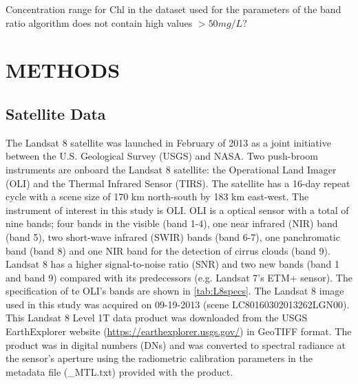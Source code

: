 \documentclass[draft]{spie}  %
\begin{document}
Concentration range for Chl in the dataset used for the parameters of the band ratio algorithm does not contain high values $> 50mg/L?$

\section{METHODS}
\label{sec:methods}
\subsection{Satellite Data}
The Landsat 8 satellite was launched in February of 2013 as a joint initiative between the U.S. Geological Survey (USGS) and NASA. Two push-broom instruments are onboard the Landsat 8 satellite: the Operational Land Imager (OLI) and the Thermal Infrared Sensor (TIRS). The satellite has a 16-day repeat cycle with a scene size of 170 km north-south by 183 km east-west. The instrument of interest in this study is OLI. OLI is a optical sensor with a total of nine bands; four bands in the visible (band 1-4), one near infrared (NIR) band (band 5), two short-wave infrared (SWIR) bands (band 6-7), one panchromatic band (band 8) and one NIR band for the detection of cirrus clouds (band 9). Landsat 8 has a higher signal-to-noise ratio (SNR) and two new bands (band 1 and band 9) compared with its predecessors (e.g. Landsat 7’s ETM+ sensor). The specification of te OLI's bands are shown in \autoref{tab:L8specs}. The Landsat 8 image used in this study was acquired on 09-19-2013 (scene LC80160302013262LGN00). This Landsat 8 Level 1T data product was downloaded from the USGS EarthExplorer website (\url{https://earthexplorer.usgs.gov/}) in GeoTIFF format. The product was in digital numbers (DNs) and was converted to spectral radiance at the sensor's aperture using the radiometric calibration parameters in the metadata file (\_MTL.txt) provided with the product.
\end{document}
